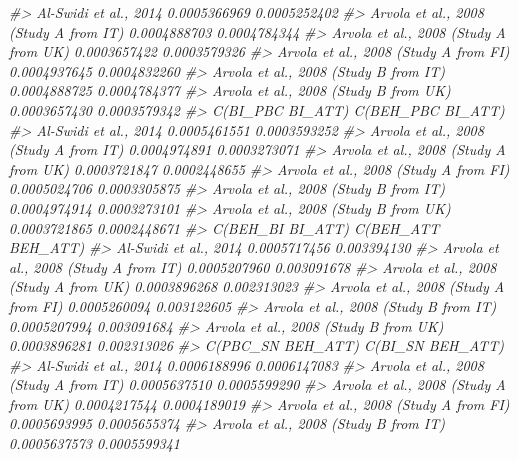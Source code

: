 \documentclass[
]{book}
\newenvironment{Shaded}{\begin{snugshade}}{\end{snugshade}}
\newcommand{\CommentTok}[1]{\textcolor[rgb]{0.56,0.35,0.01}{\textit{#1}}}
\begin{document}
\begin{Shaded}
\begin{Highlighting}[]
\CommentTok{\#\textgreater{} Al{-}Swidi et al., 2014                    0.0005366969     0.0005252402}
\CommentTok{\#\textgreater{} Arvola et al., 2008 (Study A from IT)    0.0004888703     0.0004784344}
\CommentTok{\#\textgreater{} Arvola et al., 2008 (Study A from UK)    0.0003657422     0.0003579326}
\CommentTok{\#\textgreater{} Arvola et al., 2008 (Study A from FI)    0.0004937645     0.0004832260}
\CommentTok{\#\textgreater{} Arvola et al., 2008 (Study B from IT)    0.0004888725     0.0004784377}
\CommentTok{\#\textgreater{} Arvola et al., 2008 (Study B from UK)    0.0003657430     0.0003579342}
\CommentTok{\#\textgreater{}                                       C(BI\_PBC BI\_ATT) C(BEH\_PBC BI\_ATT)}
\CommentTok{\#\textgreater{} Al{-}Swidi et al., 2014                     0.0005461551      0.0003593252}
\CommentTok{\#\textgreater{} Arvola et al., 2008 (Study A from IT)     0.0004974891      0.0003273071}
\CommentTok{\#\textgreater{} Arvola et al., 2008 (Study A from UK)     0.0003721847      0.0002448655}
\CommentTok{\#\textgreater{} Arvola et al., 2008 (Study A from FI)     0.0005024706      0.0003305875}
\CommentTok{\#\textgreater{} Arvola et al., 2008 (Study B from IT)     0.0004974914      0.0003273101}
\CommentTok{\#\textgreater{} Arvola et al., 2008 (Study B from UK)     0.0003721865      0.0002448671}
\CommentTok{\#\textgreater{}                                       C(BEH\_BI BI\_ATT) C(BEH\_ATT BEH\_ATT)}
\CommentTok{\#\textgreater{} Al{-}Swidi et al., 2014                     0.0005717456        0.003394130}
\CommentTok{\#\textgreater{} Arvola et al., 2008 (Study A from IT)     0.0005207960        0.003091678}
\CommentTok{\#\textgreater{} Arvola et al., 2008 (Study A from UK)     0.0003896268        0.002313023}
\CommentTok{\#\textgreater{} Arvola et al., 2008 (Study A from FI)     0.0005260094        0.003122605}
\CommentTok{\#\textgreater{} Arvola et al., 2008 (Study B from IT)     0.0005207994        0.003091684}
\CommentTok{\#\textgreater{} Arvola et al., 2008 (Study B from UK)     0.0003896281        0.002313026}
\CommentTok{\#\textgreater{}                                       C(PBC\_SN BEH\_ATT) C(BI\_SN BEH\_ATT)}
\CommentTok{\#\textgreater{} Al{-}Swidi et al., 2014                      0.0006188996     0.0006147083}
\CommentTok{\#\textgreater{} Arvola et al., 2008 (Study A from IT)      0.0005637510     0.0005599290}
\CommentTok{\#\textgreater{} Arvola et al., 2008 (Study A from UK)      0.0004217544     0.0004189019}
\CommentTok{\#\textgreater{} Arvola et al., 2008 (Study A from FI)      0.0005693995     0.0005655374}
\CommentTok{\#\textgreater{} Arvola et al., 2008 (Study B from IT)      0.0005637573     0.0005599341}

\end{Highlighting}
\end{Shaded}
\end{document}
